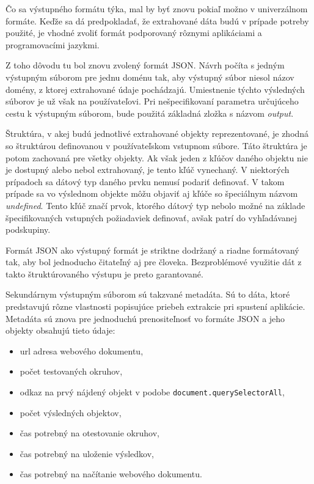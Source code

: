 Čo sa výstupného formátu týka, mal by byť znovu pokiaľ možno v univerzálnom formáte. Keďže sa dá predpokladať, že extrahované dáta budú v prípade potreby použité, je vhodné zvoliť formát podporovaný rôznymi aplikáciami a programovacími jazykmi.

Z toho dôvodu tu bol znovu zvolený formát JSON. Návrh počíta s jedným výstupným súborom pre jednu doménu tak, aby výstupný súbor niesol názov domény, z ktorej extrahované údaje pochádzajú. Umiestnenie týchto výsledných súborov je už však na používateľovi. Pri nešpecifikovaní parametra určujúceho cestu k výstupným súborom, bude použitá základná zložka s názvom \textit{output}.

\bigskip

Štruktúra, v akej budú jednotlivé extrahované objekty reprezentované, je zhodná so štruktúrou definovanou v používateľskom vstupnom súbore. Táto štruktúra je potom zachovaná pre všetky objekty. Ak však jeden z kľúčov daného objektu nie je dostupný alebo nebol extrahovaný, je tento kľúč vynechaný. V niektorých prípadoch sa dátový typ daného prvku nemusí podariť definovať. V takom prípade sa vo výslednom objekte môžu objaviť aj kľúče so špeciálnym názvom \textit{undefined}. Tento kľúč značí prvok, ktorého dátový typ nebolo možné na základe špecifikovaných vstupných požiadaviek definovať, avšak patrí do vyhľadávanej podskupiny.

Formát JSON ako výstupný formát je striktne dodržaný a riadne formátovaný tak, aby bol jednoducho čitateľný aj pre človeka. Bezproblémové využitie dát z takto štruktúrovaného výstupu je preto garantované.

\bigskip

Sekundárnym výstupným súborom sú takzvané metadáta. Sú to dáta, ktoré predstavujú rôzne vlastnosti popisujúce priebeh extrakcie pri spustení aplikácie. Metadáta sú znova pre jednoduchú prenositeľnosť vo formáte JSON a jeho objekty obsahujú tieto údaje:

\begin{itemize}
    \item url adresa webového dokumentu,
    \item počet testovaných okruhov,
    \item odkaz na prvý nájdený objekt v podobe \texttt{document.querySelectorAll},
    \item počet výsledných objektov,
    \item čas potrebný na otestovanie okruhov,
    \item čas potrebný na uloženie výsledkov,
    \item čas potrebný na načítanie webového dokumentu.
\end{itemize}

